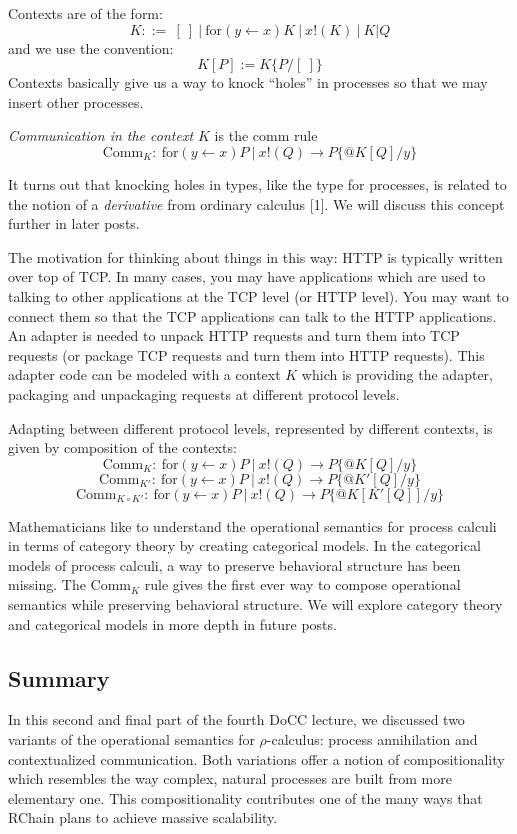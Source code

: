 \documentclass[12pt]{article}
\numberwithin{equation}{section}
\begin{document}
Contexts are of the form:
\[ K ::= \ [ \ ] \ | \ \text{for}(y \leftarrow x)K \ | \ x !(K) \ | \ K|Q \]
and we use the convention:
\[ K[P] := K \{ P/ [ \ ] \} \]
Contexts basically give us a way to knock ``holes'' in processes so that we may insert other processes.

\emph{Communication in the context $K$} is the comm rule
\[ \text{Comm}_K: \ \text{for}(y \leftarrow x)P \ | \ x !(Q) \rightarrow P \{ @K[Q]/y \} \]

It turns out that knocking holes in types, like the type for processes, is related to the notion of a \emph{derivative} from ordinary calculus [1]. We will discuss this concept further in later posts.

The motivation for thinking about things in this way: HTTP is typically written over top of TCP. In many cases, you may have applications which are used to talking to other applications at the TCP level (or HTTP level). You may want to connect them so that the TCP applications can talk to the HTTP applications. An adapter is needed to unpack HTTP requests and turn them into TCP requests (or package TCP requests and turn them into HTTP requests). This adapter code can be modeled with a context $K$ which is providing the adapter, packaging and unpackaging requests at different protocol levels.

Adapting between different protocol levels, represented by different contexts, is given by composition of the contexts:
\[ \text{Comm}_K: \ \text{for}(y \leftarrow x)P \ | \ x !(Q) \rightarrow P \{ @K[Q]/y \} \]
\[ \text{Comm}_{K'}: \ \text{for}(y \leftarrow x)P \ | \ x !(Q) \rightarrow P \{ @K'[Q]/y \} \]
\[ \text{Comm}_{K \circ K'}: \ \text{for}(y \leftarrow x)P \ | \ x !(Q) \rightarrow P \{ @K[K'[Q]]/y \} \]

Mathematicians like to understand the operational semantics for process calculi in terms of category theory by creating categorical models. In the categorical models of process calculi, a way to preserve behavioral structure has been missing. The $\text{Comm}_K$ rule gives the first ever way to compose operational semantics while preserving behavioral structure. We will explore category theory and categorical models in more depth in future posts.

\subsection{Summary}
In this second and final part of the fourth DoCC lecture, we discussed two variants of the operational semantics for $\rho$-calculus: process annihilation and contextualized communication. Both variations offer a notion of compositionality which resembles the way complex, natural processes are built from more elementary one. This compositionality contributes one of the many ways that RChain plans to achieve massive scalability. 
\end{document}
